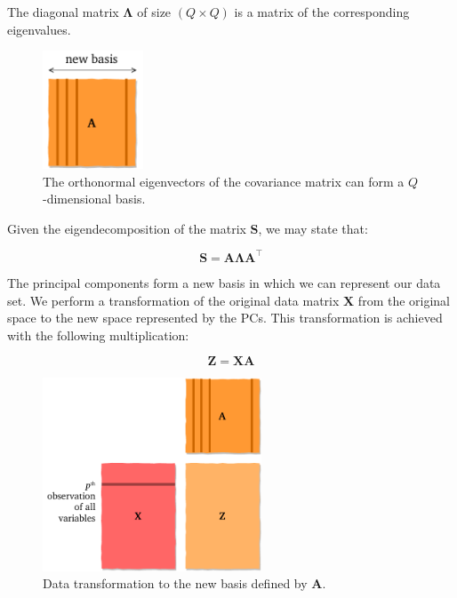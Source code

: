 \documentclass[10pt,twocolumn]{article}
\begin{document}
The diagonal matrix $\mathbf{\Lambda}$ of size $(Q \times Q)$ is a matrix of the corresponding eigenvalues.

\begin{figure}[H]
\centering\includegraphics[width=3cm]{new-basis.pdf}
\caption{The orthonormal eigenvectors of the covariance matrix can form a $Q$-dimensional basis.}
\label{fig:new-basis}
\end{figure}

Given the eigendecomposition of the matrix $\mathbf{S}$, we may state that: 

\begin{equation} \label{eq:eig-dec-cov-matrix}
\mathbf{S} = \mathbf{A} \mathbf{\Lambda} \mathbf{A}^{\top}
\end{equation}

The principal components form a new basis in which we can represent our data set. We perform a transformation of the original data matrix $\mathbf{X}$ from the original space to the new space represented by the PCs. This transformation is achieved with the following multiplication:

\begin{equation} \label{eq:data-transform}
\mathbf{Z} = \mathbf{X} \mathbf{A}
\end{equation}

\begin{figure}[H]
\centering\includegraphics[width=6.5cm]{data-transformation.pdf}
\caption{Data transformation to the new basis defined by $\mathbf{A}$.}
\label{fig:data-transformation}
\end{figure}
\end{document}
